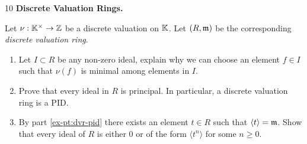 \documentclass[Notebook.tex]{subfiles}
\begin{document}
    \begin{problem}{10}
         \textbf{Discrete Valuation Rings.} 
         
         Let $\nu:\mathbb K^{\times} \to \mathbb Z$ be a discrete valuation on $\mathbb K$. Let $(R,\operatorname{\mathfrak{m}})$ be the corresponding \emph{discrete valuation ring}. 
        \begin{enumerate}[label=(\alph*),ref=\theenumi\alph*]
            \item Let $I \subset R$ be any non-zero ideal, explain why we can choose an element $f \in I $ such that $\nu(f)$ is minimal among elements in $I$.
            \item\label{ex-pt:dvr-pid}  Prove that every ideal in $R$ is principal. In particular, a discrete valuation ring is a PID. 
            \item By part \ref{ex-pt:dvr-pid} there exists an element $t\in R$ such that $\langle t \rangle = \operatorname{\mathfrak{m}}$. Show that every ideal of $R$ is either $0$ or of the form $\langle t^{n} \rangle$ for some $n\geq0$. 
        \end{enumerate}
    \end{problem}
\end{document}
